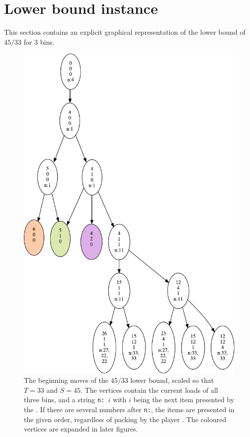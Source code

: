\section{Lower bound instance}\label{sec:4:instance}

This section contains an explicit graphical representation of the
lower bound of $45/33$ for $3$ bins.

\begin{figure}
  \centering
  \includegraphics[scale=0.65]{img/big_picture.pdf}
  \caption{The beginning moves of the $45/33$ lower bound, scaled so
      that $T = 33$ and $S = 45$. The vertices contain the current
      loads of all three bins, and a string \texttt{n: $i$} with $i$
      being the next item presented by the \adversary. If there are
      several numbers after \texttt{n:}, the items are presented in
      the given order, regardless of packing by the player \algo. The coloured vertices are expanded in later figures.}
\end{figure}
